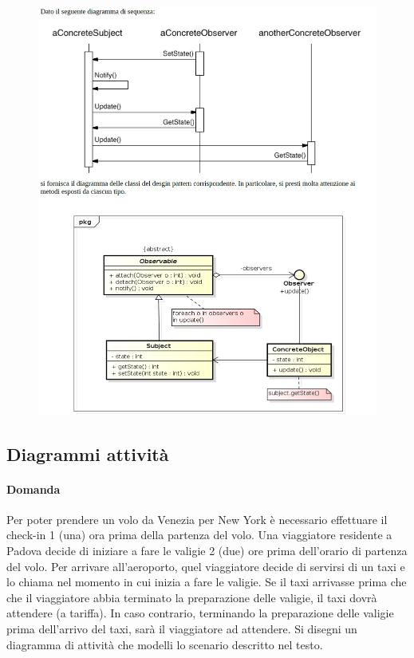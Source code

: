 \begin{figure}[H]\center
\includegraphics[width=1\textwidth]{res/img/Esercizi/es-observer2}
\end{figure}


\subsection{Diagrammi attività}

\paragraph{Domanda}
Per poter prendere un volo da Venezia per New York è necessario effettuare il check-in 1 (una) ora prima della partenza
del volo. Una viaggiatore residente a Padova decide di iniziare a fare le valigie 2 (due) ore prima dell'orario di partenza del
volo. Per arrivare all'aeroporto, quel viaggiatore decide di servirsi di un taxi e lo chiama nel momento in cui inizia a fare
le valigie. Se il taxi arrivasse prima che che il viaggiatore abbia terminato la preparazione delle valigie, il taxi dovrà
attendere (a tariffa). In caso contrario, terminando la preparazione delle valigie prima dell'arrivo del taxi, sarà il viaggiatore ad attendere.
Si disegni un diagramma di attività che modelli lo scenario descritto nel testo.
 
